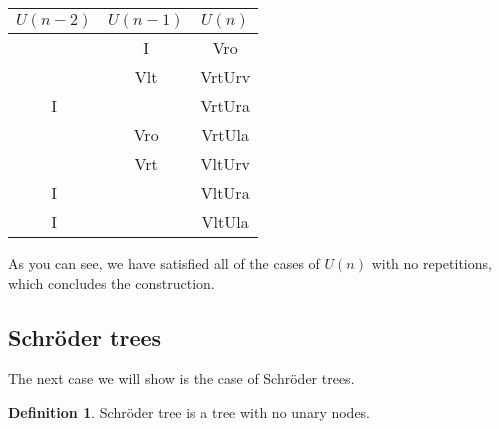 \documentclass[final]{article}
\theoremstyle{definition}
\newtheorem{definition}{Definition}[subsection]
\theoremstyle{remark}
\begin{document}
\begin{center}
    \begin{longtable}{| c | c | c |}
        \hline

        \(U(n-2)\) &
        \(U(n-1)\) &
        \(U(n)\)\\
        \hline

        &
        I  &
        Vro  \\
        \hline

        &
        Vlt  &
        VrtUrv  \\
        \hline

        I  &
        &
        VrtUra  \\
        \hline

        &
        Vro  &
        VrtUla  \\
        \hline

        &
        Vrt  &
        VltUrv  \\
        \hline

        I  &
        &
        VltUra  \\
        \hline

        I  &
        &
        VltUla  \\
        \hline
    \end{longtable}
\end{center}


As you can see, we have satisfied all of the cases of \(U(n)\) with no repetitions, which concludes the construction.

\subsection{Schröder trees}%
\label{sub:schröder_trees}

The next case we will show is the case of Schröder trees\cite{schroder}.

\begin{definition}
    Schröder tree is a tree with no unary nodes.
\end{definition}
\end{document}
